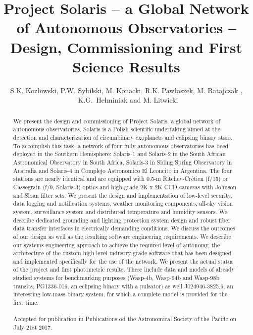 \documentclass[iop,twocolappendix,numberedappendix]{emulateapj}
\begin{document}
\title{Project Solaris -- a Global Network of Autonomous Observatories -- Design,  Commissioning and First Science Results}

\author{S.K. Koz\l owski, P.W. Sybilski, M. Konacki, R.K. Paw\l aszek, M. Ratajczak , ~K.G.~He\l miniak and M. Litwicki}


\begin{abstract}
We present the design and commissioning of Project Solaris, a global network of autonomous observatories. Solaris is a Polish scientific undertaking aimed at the detection and characterization of circumbinary exoplanets and eclipsing binary stars. To accomplish this task, a network of four fully autonomous observatories has beed deployed in the Southern Hemisphere: Solaris-1 and Solaris-2 in the South African Astronomical Observatory in South Africa, Solaris-3 in Siding Spring Observatory in Australia and Solaris-4 in Complejo Astronomico El Leoncito in Argentina. The four stations are nearly identical and are equipped with 0.5-m Ritchey-Cr\'{e}tien (f/15) or Cassegrain (f/9, Solaris-3) optics and high-grade 2K x 2K  CCD cameras with Johnson and Sloan filter sets. We present the design and implementation of low-level security, data logging and notification systems, weather monitoring components, all-sky vision system, surveillance system and distributed temperature and humidity sensors. We describe dedicated grounding and lighting protection system design and robust fiber data transfer interfaces in electrically demanding conditions. We discuss the outcomes of our design as well as the resulting software engineering requirements. We describe our systems engineering approach to achieve the required level of autonomy, the architecture of the custom high-level industry-grade software that has been designed and implemented specifically for the use of the network. We present the actual status of the project and first photometric results. These include data and models of already studied systems for benchmarking purposes (Wasp-4b, Wasp-64b and Wasp-98b transits, PG1336-016, an eclipsing binary with a pulsator) as well J024946-3825.6, an interesting low-mass binary system, for which a complete model is provided for the first time. 
\\
\\
\footnotesize
Accepted for publication in Publications od the Astronomical Society of the Pacific on July 21st 2017. 
\normalsize
\end{abstract}
\end{document}
